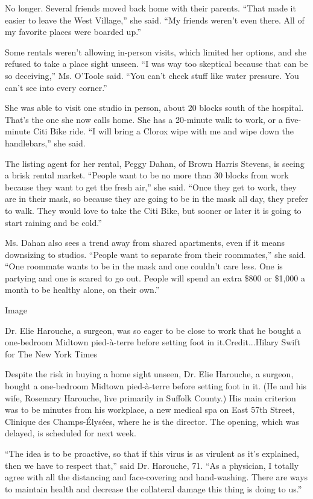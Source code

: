No longer. Several friends moved back home with their parents. ``That
made it easier to leave the West Village,'' she said. ``My friends
weren't even there. All of my favorite places were boarded up.''

Some rentals weren't allowing in-person visits, which limited her
options, and she refused to take a place sight unseen. ``I was way too
skeptical because that can be so deceiving,'' Ms. O'Toole said. ``You
can't check stuff like water pressure. You can't see into every
corner.''

She was able to visit one studio in person, about 20 blocks south of the
hospital. That's the one she now calls home. She has a 20-minute walk to
work, or a five-minute Citi Bike ride. ``I will bring a Clorox wipe with
me and wipe down the handlebars,'' she said.

The listing agent for her rental, Peggy Dahan, of Brown Harris Stevens,
is seeing a brisk rental market. ``People want to be no more than 30
blocks from work because they want to get the fresh air,'' she said.
``Once they get to work, they are in their mask, so because they are
going to be in the mask all day, they prefer to walk. They would love to
take the Citi Bike, but sooner or later it is going to start raining and
be cold.''

Ms. Dahan also sees a trend away from shared apartments, even if it
means downsizing to studios. ``People want to separate from their
roommates,'' she said. ``One roommate wants to be in the mask and one
couldn't care less. One is partying and one is scared to go out. People
will spend an extra \$800 or \$1,000 a month to be healthy alone, on
their own.''

Image

Dr. Elie Harouche, a surgeon, was so eager to be close to work that he
bought a one-bedroom Midtown pied-à-terre before setting foot in
it.Credit...Hilary Swift for The New York Times

Despite the risk in buying a home sight unseen, Dr. Elie Harouche, a
surgeon, bought a one-bedroom Midtown pied-à-terre before setting foot
in it. (He and his wife, Rosemary Harouche, live primarily in Suffolk
County.) His main criterion was to be minutes from his workplace, a new
medical spa on East 57th Street, Clinique des Champs-Élysées, where he
is the director. The opening, which was delayed, is scheduled for next
week.

``The idea is to be proactive, so that if this virus is as virulent as
it's explained, then we have to respect that,'' said Dr. Harouche, 71.
``As a physician, I totally agree with all the distancing and
face-covering and hand-washing. There are ways to maintain health and
decrease the collateral damage this thing is doing to us.''

